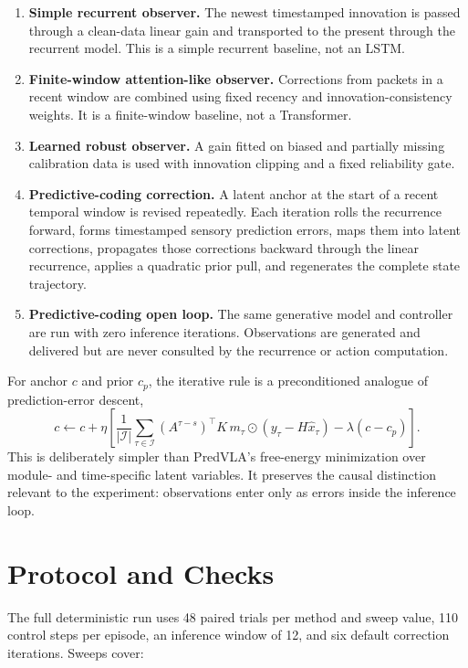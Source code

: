 \documentclass[11pt]{article}
\begin{document}
\begin{enumerate}[leftmargin=1.5em]
  \item \textbf{Simple recurrent observer.} The newest timestamped innovation is passed through a clean-data linear gain and transported to the present through the recurrent model. This is a simple recurrent baseline, not an LSTM.
  \item \textbf{Finite-window attention-like observer.} Corrections from packets in a recent window are combined using fixed recency and innovation-consistency weights. It is a finite-window baseline, not a Transformer.
  \item \textbf{Learned robust observer.} A gain fitted on biased and partially missing calibration data is used with innovation clipping and a fixed reliability gate.
  \item \textbf{Predictive-coding correction.} A latent anchor at the start of a recent temporal window is revised repeatedly. Each iteration rolls the recurrence forward, forms timestamped sensory prediction errors, maps them into latent corrections, propagates those corrections backward through the linear recurrence, applies a quadratic prior pull, and regenerates the complete state trajectory.
  \item \textbf{Predictive-coding open loop.} The same generative model and controller are run with zero inference iterations. Observations are generated and delivered but are never consulted by the recurrence or action computation.
\end{enumerate}

For anchor $c$ and prior $c_p$, the iterative rule is a preconditioned analogue of prediction-error descent,
\[
c\leftarrow c+\eta\left[\frac{1}{|\mathcal I|}\sum_{\tau\in\mathcal I}(A^{\tau-s})^\top K\,m_\tau\odot(y_\tau-H\hat x_\tau)-\lambda(c-c_p)\right].
\]
This is deliberately simpler than PredVLA's free-energy minimization over module- and time-specific latent variables. It preserves the causal distinction relevant to the experiment: observations enter only as errors inside the inference loop.

\section{Protocol and Checks}

The full deterministic run uses 48 paired trials per method and sweep value, 110 control steps per episode, an inference window of 12, and six default correction iterations. Sweeps cover:
\end{document}

